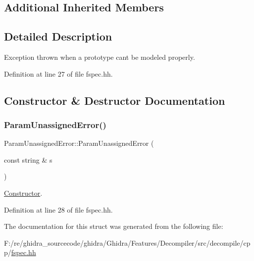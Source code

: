 \subsection*{Additional Inherited Members}


\subsection{Detailed Description}
Exception thrown when a prototype can\textquotesingle{}t be modeled properly. 

Definition at line 27 of file fspec.\+hh.



\subsection{Constructor \& Destructor Documentation}
\mbox{\label{struct_param_unassigned_error_a07aae61447f2c586e1a66667ea150615}} 
\subsubsection{\texorpdfstring{ParamUnassignedError()}{ParamUnassignedError()}}
{\footnotesize\ttfamily Param\+Unassigned\+Error\+::\+Param\+Unassigned\+Error (\begin{DoxyParamCaption}\item[{const string \&}]{s }\end{DoxyParamCaption})\hspace{0.3cm}{\ttfamily [inline]}}



\mbox{\hyperlink{class_constructor}{Constructor}}. 



Definition at line 28 of file fspec.\+hh.



The documentation for this struct was generated from the following file\+:\begin{DoxyCompactItemize}
\item 
F\+:/re/ghidra\+\_\+sourcecode/ghidra/\+Ghidra/\+Features/\+Decompiler/src/decompile/cpp/\mbox{\hyperlink{fspec_8hh}{fspec.\+hh}}\end{DoxyCompactItemize}
